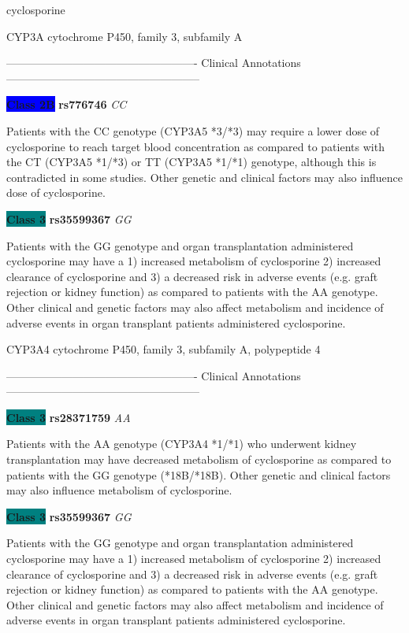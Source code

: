 \documentclass{resume} %
\begin{document}
\begin{rSection}{ cyclosporine }
\begin{rSubsection}{ CYP3A }{ cytochrome P450, family 3, subfamily A }{}{}
\item[] ---------------------------------------------------- Clinical Annotations -----------------------------------------------------\newline
\item \textbf{\colorbox{blue} {Class 2B}} \textbf{ rs776746 } \textit{ CC }
\item[] Patients with the CC genotype (CYP3A5 *3/*3) may require a lower dose of cyclosporine to reach target blood concentration as compared to patients with the CT (CYP3A5 *1/*3) or TT (CYP3A5 *1/*1) genotype, although this is contradicted in some studies. Other genetic and clinical factors may also influence dose of cyclosporine.\item \textbf{\colorbox{teal} {Class 3}} \textbf{ rs35599367 } \textit{ GG }
\item[] Patients with the GG genotype and organ transplantation administered cyclosporine may have a 1) increased metabolism of cyclosporine 2) increased clearance of cyclosporine and 3) a decreased risk in adverse events (e.g. graft rejection or kidney function) as compared to patients with the AA genotype. Other clinical and genetic factors may also affect metabolism and incidence of adverse events in organ transplant patients administered cyclosporine. 
\end{rSubsection}\begin{rSubsection}{ CYP3A4 }{ cytochrome P450, family 3, subfamily A, polypeptide 4 }{}{}
\item[]

\item[] ---------------------------------------------------- Clinical Annotations -----------------------------------------------------\newline
\item \textbf{\colorbox{teal} {Class 3}} \textbf{ rs28371759 } \textit{ AA }
\item[] Patients with the AA genotype (CYP3A4 *1/*1) who underwent kidney transplantation may have decreased metabolism of cyclosporine as compared to patients with the GG genotype (*18B/*18B). Other genetic and clinical factors may also influence metabolism of cyclosporine.\item \textbf{\colorbox{teal} {Class 3}} \textbf{ rs35599367 } \textit{ GG }
\item[] Patients with the GG genotype and organ transplantation administered cyclosporine may have a 1) increased metabolism of cyclosporine 2) increased clearance of cyclosporine and 3) a decreased risk in adverse events (e.g. graft rejection or kidney function) as compared to patients with the AA genotype. Other clinical and genetic factors may also affect metabolism and incidence of adverse events in organ transplant patients administered cyclosporine. 
\end{rSubsection}


\end{rSection}
\end{document}
